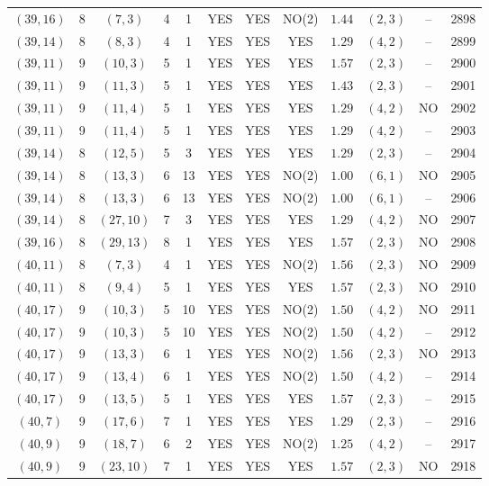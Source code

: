 \begin{longtable}{|c|c|c|c|c|c|c|c|c|c|c|c|}
$(39,16)$ & 8 & $(7,3)$ & 4 & 1 & YES & YES & NO(2) & $1.44$ & $(2,3)$ & -- & 2898\\
$(39,14)$ & 8 & $(8,3)$ & 4 & 1 & YES & YES & YES & $1.29$ & $(4,2)$ & -- & 2899\\
$(39,11)$ & 9 & $(10,3)$ & 5 & 1 & YES & YES & YES & $1.57$ & $(2,3)$ & -- & 2900\\
$(39,11)$ & 9 & $(11,3)$ & 5 & 1 & YES & YES & YES & $1.43$ & $(2,3)$ & -- & 2901\\
$(39,11)$ & 9 & $(11,4)$ & 5 & 1 & YES & YES & YES & $1.29$ & $(4,2)$ & NO & 2902\\
$(39,11)$ & 9 & $(11,4)$ & 5 & 1 & YES & YES & YES & $1.29$ & $(4,2)$ & -- & 2903\\
$(39,14)$ & 8 & $(12,5)$ & 5 & 3 & YES & YES & YES & $1.29$ & $(2,3)$ & -- & 2904\\
$(39,14)$ & 8 & $(13,3)$ & 6 & 13 & YES & YES & NO(2) & $1.00$ & $(6,1)$ & NO & 2905\\
$(39,14)$ & 8 & $(13,3)$ & 6 & 13 & YES & YES & NO(2) & $1.00$ & $(6,1)$ & -- & 2906\\
$(39,14)$ & 8 & $(27,10)$ & 7 & 3 & YES & YES & YES & $1.29$ & $(4,2)$ & NO & 2907\\
$(39,16)$ & 8 & $(29,13)$ & 8 & 1 & YES & YES & YES & $1.57$ & $(2,3)$ & NO & 2908\\
$(40,11)$ & 8 & $(7,3)$ & 4 & 1 & YES & YES & NO(2) & $1.56$ & $(2,3)$ & NO & 2909\\
$(40,11)$ & 8 & $(9,4)$ & 5 & 1 & YES & YES & YES & $1.57$ & $(2,3)$ & NO & 2910\\
$(40,17)$ & 9 & $(10,3)$ & 5 & 10 & YES & YES & NO(2) & $1.50$ & $(4,2)$ & NO & 2911\\
$(40,17)$ & 9 & $(10,3)$ & 5 & 10 & YES & YES & NO(2) & $1.50$ & $(4,2)$ & -- & 2912\\
$(40,17)$ & 9 & $(13,3)$ & 6 & 1 & YES & YES & NO(2) & $1.56$ & $(2,3)$ & NO & 2913\\
$(40,17)$ & 9 & $(13,4)$ & 6 & 1 & YES & YES & NO(2) & $1.50$ & $(4,2)$ & -- & 2914\\
$(40,17)$ & 9 & $(13,5)$ & 5 & 1 & YES & YES & YES & $1.57$ & $(2,3)$ & -- & 2915\\
$(40,7)$ & 9 & $(17,6)$ & 7 & 1 & YES & YES & YES & $1.29$ & $(2,3)$ & -- & 2916\\
$(40,9)$ & 9 & $(18,7)$ & 6 & 2 & YES & YES & NO(2) & $1.25$ & $(4,2)$ & -- & 2917\\
$(40,9)$ & 9 & $(23,10)$ & 7 & 1 & YES & YES & YES & $1.57$ & $(2,3)$ & NO & 2918\\

\end{longtable}
